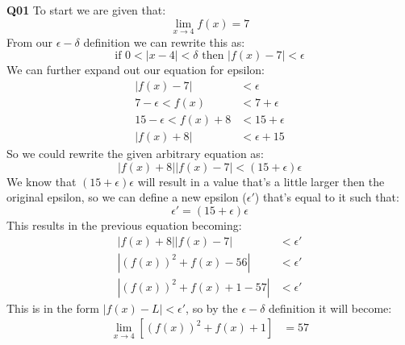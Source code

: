 \documentclass[11pt]{article}
\begin{document}
\parindent=0pt

\textbf{Q01} To start we are given that:
\[ \lim_{x \to 4} f(x) = 7 \]
From our $\epsilon-\delta$ definition we can rewrite this as:
\[ \text{if } 0 < |x - 4| < \delta \text{ then } |f(x) - 7| < \epsilon \]
We can further expand out our equation for epsilon:
\begin{align*}
|f(x) - 7|  & < \epsilon\\
7 - \epsilon <  f(x)  & < 7 + \epsilon\\
15 - \epsilon <  f(x) + 8  & < 15 + \epsilon\\
|f(x) + 8|  & < \epsilon + 15
\end{align*}
So we could rewrite the given arbitrary equation as:
\[ |f(x) + 8||f(x) - 7| < (15 + \epsilon)\epsilon \]
We know that $ (15 + \epsilon)\epsilon$ will result in a value that's a little larger then the original epsilon, so we can define a new epsilon ($\epsilon'$) that's equal to it such that:
\[ \epsilon' = (15 + \epsilon)\epsilon  \]
This results in the previous equation becoming:
\begin{align*}
|f(x) + 8||f(x) - 7| & <\epsilon' \\
|(f(x))^2 + f(x) - 56| & <\epsilon'  \\
|(f(x))^2 + f(x) + 1 - 57| & <\epsilon' 
\end{align*}
This is in the form $|f(x) -L| < \epsilon' $, so by the  $\epsilon-\delta$ definition it will become: 
\begin{align*}
 \lim_{x \to 4}[(f(x))^2 + f(x) + 1] & = 57
\end{align*}
\end{document}
